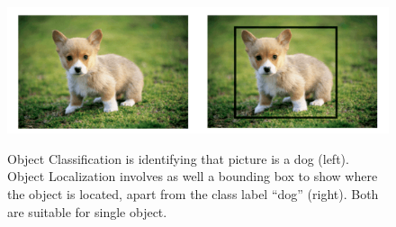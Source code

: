 \documentclass[12pt,a4paper]{report}
\newcommand{\alleg}{\enquote}
\begin{document}
	\begin{figure}[h!]
		\caption{Object Classification is identifying that picture is a dog (left). Object 
			Localization involves as well a bounding box to show where the object is located, 
			apart from the class label \alleg{dog} (right). Both are suitable for single object.}
		\centering
		\includegraphics[width=\textwidth]{clas_loc}
		\label{fig:clas}
	\end{figure}
	
\end{document}
